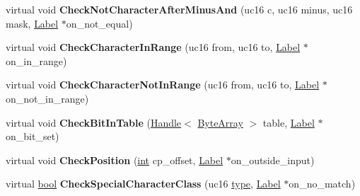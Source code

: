 \begin{DoxyCompactItemize}
\item 
\mbox{\label{classv8_1_1internal_1_1RegExpMacroAssemblerARM64_a5cee9315b3959c1247ef4aa32a30f36b}} 
virtual void {\bfseries Check\+Not\+Character\+After\+Minus\+And} (uc16 c, uc16 minus, uc16 mask, \mbox{\hyperlink{classv8_1_1internal_1_1Label}{Label}} $\ast$on\+\_\+not\+\_\+equal)
\item 
\mbox{\label{classv8_1_1internal_1_1RegExpMacroAssemblerARM64_a8bdf8cecb4e773a87fdfdd53aead5d2c}} 
virtual void {\bfseries Check\+Character\+In\+Range} (uc16 from, uc16 to, \mbox{\hyperlink{classv8_1_1internal_1_1Label}{Label}} $\ast$on\+\_\+in\+\_\+range)
\item 
\mbox{\label{classv8_1_1internal_1_1RegExpMacroAssemblerARM64_af2f36c16eee2658fe7bb92c1e885b365}} 
virtual void {\bfseries Check\+Character\+Not\+In\+Range} (uc16 from, uc16 to, \mbox{\hyperlink{classv8_1_1internal_1_1Label}{Label}} $\ast$on\+\_\+not\+\_\+in\+\_\+range)
\item 
\mbox{\label{classv8_1_1internal_1_1RegExpMacroAssemblerARM64_afdef7b32d4a6659e601a74ad3a5a9716}} 
virtual void {\bfseries Check\+Bit\+In\+Table} (\mbox{\hyperlink{classv8_1_1internal_1_1Handle}{Handle}}$<$ \mbox{\hyperlink{classv8_1_1internal_1_1ByteArray}{Byte\+Array}} $>$ table, \mbox{\hyperlink{classv8_1_1internal_1_1Label}{Label}} $\ast$on\+\_\+bit\+\_\+set)
\item 
\mbox{\label{classv8_1_1internal_1_1RegExpMacroAssemblerARM64_ab43f2dad1fca64470f90cef9fdbd8539}} 
virtual void {\bfseries Check\+Position} (\mbox{\hyperlink{classint}{int}} cp\+\_\+offset, \mbox{\hyperlink{classv8_1_1internal_1_1Label}{Label}} $\ast$on\+\_\+outside\+\_\+input)
\item 
\mbox{\label{classv8_1_1internal_1_1RegExpMacroAssemblerARM64_a784e38bb18a948a3e2570e6e0ab32b83}} 
virtual \mbox{\hyperlink{classbool}{bool}} {\bfseries Check\+Special\+Character\+Class} (uc16 \mbox{\hyperlink{classstd_1_1conditional_1_1type}{type}}, \mbox{\hyperlink{classv8_1_1internal_1_1Label}{Label}} $\ast$on\+\_\+no\+\_\+match)

\end{DoxyCompactItemize}
